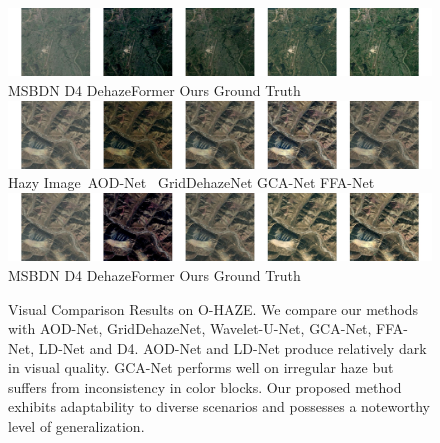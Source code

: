 \documentclass[lettersize,journal]{IEEEtran}
\begin{document}
\begin{figure}[pht]
    \includegraphics[width=14.5cm]{rice_2_2.jpg} \\
    MSBDN \cite{msbdn2020}\qquad\quad D4\cite{yang2022d4} \quad\;\;\; DehazeFormer\cite{dehazeformer} \qquad\; Ours \qquad\quad\;\; Ground Truth \\
    
    \includegraphics[width=14.5cm]{rice_3_1.jpg} \\
    Hazy Image\qquad\;\ AOD-Net\cite{li2017aod} \;\ GridDehazeNet\cite{liu2019griddehazenet} \;\; GCA-Net\cite{chen2019gated} \quad\; FFA-Net\cite{qin2020ffa}\\   
    
    \includegraphics[width=14.5cm]{rice_3_2.jpg} \\
    MSBDN \cite{msbdn2020}\qquad\quad D4\cite{yang2022d4} \quad\;\;\; DehazeFormer\cite{dehazeformer} \qquad\; Ours \qquad\quad\;\; Ground Truth \\    
    
    \caption{Visual Comparison Results on O-HAZE. We compare our methods with AOD-Net\cite{li2017aod}, GridDehazeNet\cite{liu2019griddehazenet}, Wavelet-U-Net\cite{yang2019wavelet}, GCA-Net\cite{chen2019gated}, FFA-Net\cite{qin2020ffa}, LD-Net\cite{ullah2021light} and D4\cite{yang2022d4}. AOD-Net and LD-Net produce relatively dark in visual quality. GCA-Net performs well on irregular haze but suffers from inconsistency in color blocks. Our proposed method exhibits adaptability to diverse scenarios and possesses a noteworthy level of generalization. }
    \label{rice}
\end{figure}
\end{document}
